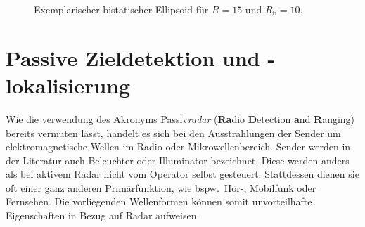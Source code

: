\begin{figure}[htb]
    \centering
    \caption{Exemplarischer bistatischer Ellipsoid für \(R = 15\) und \(R_\text{b} = 10\).}\label{fig:bistatic_ellipsoid}
\end{figure}

\section{Passive Zieldetektion und -lokalisierung}

Wie die verwendung des Akronyms Passiv\emph{radar} (\textbf{Ra}dio \textbf{D}etection \textbf{a}nd \textbf{R}anging) bereits vermuten lässt, handelt es sich bei den Ausstrahlungen der Sender um elektromagnetische Wellen im Radio oder Mikrowellenbereich. Sender werden in der Literatur auch Beleuchter oder Illuminator bezeichnet. Diese werden anders als bei aktivem Radar nicht vom Operator selbst gesteuert. Stattdessen dienen sie oft einer ganz anderen Primärfunktion, wie bspw.\ Hör-, Mobilfunk oder Fernsehen. Die vorliegenden Wellenformen können somit unvorteilhafte Eigenschaften in Bezug auf Radar aufweisen.

